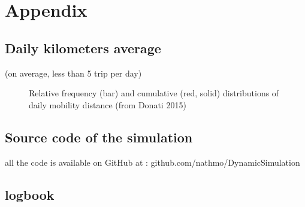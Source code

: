 \section{Appendix}

\subsection{Daily kilometers average}
(on average, less than 5 trip per day)
\begin{figure}[h!]
    \centering
    \hfill
    \caption{Relative frequency (bar) and cumulative (red, solid) distributions of daily mobility distance (from Donati 2015\cite{donati_individual_2015})}
    \label{fig:daily-lenght-travel}
\end{figure}

\subsection{Source code of the simulation}
all the code is available on GitHub at : github.com/nathmo/DynamicSimulation

\newpage 

\subsection{logbook}

